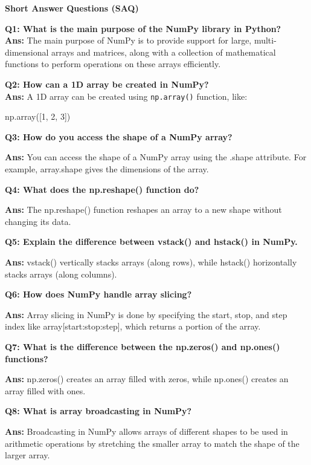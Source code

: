 \documentclass[
  letterpaper,
  DIV=11,
  numbers=noendperiod]{scrreprt}
\newenvironment{Shaded}{\begin{snugshade}}{\end{snugshade}}
\newcommand{\DecValTok}[1]{\textcolor[rgb]{0.68,0.00,0.00}{#1}}
\newcommand{\NormalTok}[1]{\textcolor[rgb]{0.00,0.23,0.31}{#1}}
\theoremstyle{plain}
\theoremstyle{definition}
\theoremstyle{remark}
\begin{document}
\textbf{Short Answer Questions (SAQ)}

\textbf{Q1: What is the main purpose of the NumPy library in Python?}\\
\textbf{Ans:} The main purpose of NumPy is to provide support for large,
multi-dimensional arrays and matrices, along with a collection of
mathematical functions to perform operations on these arrays
efficiently.

\textbf{Q2: How can a 1D array be created in NumPy?}\\
\textbf{Ans:} A 1D array can be created using \texttt{np.array()}
function, like:

\begin{Shaded}
\begin{Highlighting}[]
\NormalTok{np.array([}\DecValTok{1}\NormalTok{, }\DecValTok{2}\NormalTok{, }\DecValTok{3}\NormalTok{])}
\end{Highlighting}
\end{Shaded}

\textbf{Q3: How do you access the shape of a NumPy array?}

\textbf{Ans:} You can access the shape of a NumPy array using the .shape
attribute. For example, array.shape gives the dimensions of the array.

\textbf{Q4: What does the np.reshape() function do?}

\textbf{Ans:} The np.reshape() function reshapes an array to a new shape
without changing its data.

\textbf{Q5: Explain the difference between vstack() and hstack() in
NumPy.}

\textbf{Ans:} vstack() vertically stacks arrays (along rows), while
hstack() horizontally stacks arrays (along columns).

\textbf{Q6: How does NumPy handle array slicing?}

\textbf{Ans:} Array slicing in NumPy is done by specifying the start,
stop, and step index like array{[}start:stop:step{]}, which returns a
portion of the array.

\textbf{Q7: What is the difference between the np.zeros() and np.ones()
functions?}

\textbf{Ans:} np.zeros() creates an array filled with zeros, while
np.ones() creates an array filled with ones.

\textbf{Q8: What is array broadcasting in NumPy?}

\textbf{Ans:} Broadcasting in NumPy allows arrays of different shapes to
be used in arithmetic operations by stretching the smaller array to
match the shape of the larger array.
\end{document}
